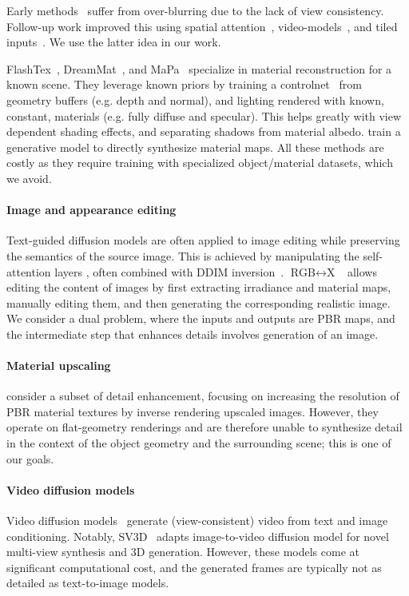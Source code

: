 Early methods~\cite{richardson2023texture,chen2023text2tex,cao2023textfusion} suffer from over-blurring due to the lack of view consistency. 
Follow-up work improved this using spatial attention~\cite{shi2023MVDream}, video-models~\cite{voleti2024sv3d, wu2024cat4d}, and tiled inputs~\cite{flashtex}.
We use the latter idea in our work.

FlashTex~\cite{flashtex}, DreamMat~\cite{dreammat}, and MaPa~\cite{mapa} specialize in material reconstruction for a 
known scene. They leverage known priors by training a controlnet~\cite{controlnet} from geometry buffers 
(e.g. depth and normal), and lighting rendered with known, constant, materials (e.g. fully diffuse and specular). 
This helps greatly with view dependent shading effects, and separating shadows from material albedo. 
\citet{Vecchio2024controlmat} train a generative model to directly synthesize material maps.
All these methods are costly as they require training with specialized object/material datasets, which we avoid.






\paragraph{Image and appearance editing}
Text-guided diffusion models are often applied to image editing while preserving the semantics of the source image.
This is achieved by manipulating the self-attention layers 
\cite{tumanyan2023pnp}, often combined with DDIM inversion~\cite{mokady2023nulltext,parmar2023pix2pixzero}.
$\text{RGB}{\leftrightarrow}\text{X}$~\cite{RGBX} allows editing the content of images by first extracting irradiance and material maps, manually editing them, and then generating the corresponding realistic image.
We consider a dual problem, where the inputs and outputs are PBR maps, and the intermediate step that enhances details involves generation of an image.




\paragraph{Material upscaling}
\citet{gauthier2024matup} consider a subset of detail enhancement, focusing on increasing the resolution of PBR material textures by inverse rendering upscaled images.
However, they operate on flat-geometry renderings and are therefore unable to synthesize detail in the context of the object geometry and the surrounding scene; this is one of our goals.


\paragraph{Video diffusion models}
Video diffusion models~\cite{blattmann2023svd,hong2023cogvideo,yang2024cogvideox} generate (view-consistent) video from text and image conditioning. Notably, SV3D~\cite{voleti2024sv3d} adapts image-to-video diffusion model for novel multi-view synthesis and 3D generation. However, these models come at significant computational cost, and the generated frames are typically not as detailed as text-to-image models.
